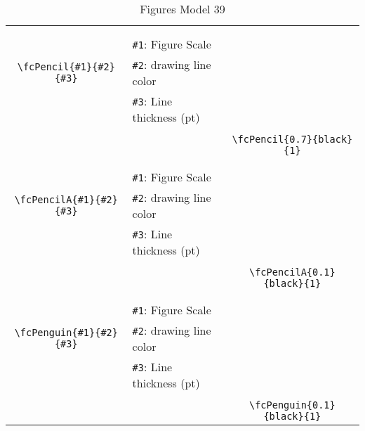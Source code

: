 \documentclass[x11names]{article}
\begin{document}
\begin{table}[H]
\begin{tabular}{|c|l|c|}
	&&\multirow{5}{*}{\fcPencil{0.7}{black}{1}}\\	&&\\	&\verb|#1|: Figure Scale &\\	\verb|\fcPencil{#1}{#2}{#3}|&	\verb|#2|: drawing line color &\\	&\verb|#3|: Line thickness (pt) &\\ &&\\&&	\verb|\fcPencil{0.7}{black}{1}|\\\hline 	
	&&\multirow{5}{*}{\fcPencilA{0.1}{black}{1}}\\	&&\\	&\verb|#1|: Figure Scale &\\	\verb|\fcPencilA{#1}{#2}{#3}|&	\verb|#2|: drawing line color &\\	&\verb|#3|: Line thickness (pt) &\\ &&\\&&	\verb|\fcPencilA{0.1}{black}{1}|\\\hline 	
	&&\multirow{5}{*}{\fcPenguin{0.1}{black}{1}}\\	&&\\	&\verb|#1|: Figure Scale &\\	\verb|\fcPenguin{#1}{#2}{#3}|&	\verb|#2|: drawing line color &\\	&\verb|#3|: Line thickness (pt) &\\ &&\\&&	\verb|\fcPenguin{0.1}{black}{1}|\\\hline 	\hline\end{tabular}\caption{Figures Model 39}\label{tab39}\end{table}
\end{document}
